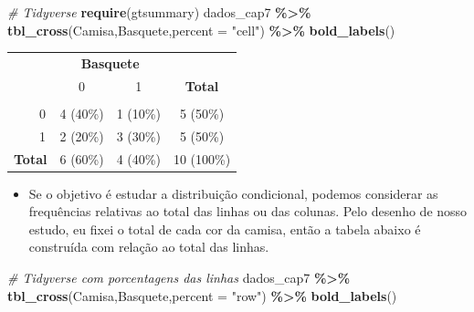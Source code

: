 \documentclass[
]{book}
\newenvironment{Shaded}{\begin{snugshade}}{\end{snugshade}}
\newcommand{\AttributeTok}[1]{\textcolor[rgb]{0.13,0.29,0.53}{#1}}
\newcommand{\CommentTok}[1]{\textcolor[rgb]{0.56,0.35,0.01}{\textit{#1}}}
\newcommand{\FunctionTok}[1]{\textcolor[rgb]{0.13,0.29,0.53}{\textbf{#1}}}
\newcommand{\NormalTok}[1]{#1}
\newcommand{\SpecialCharTok}[1]{\textcolor[rgb]{0.81,0.36,0.00}{\textbf{#1}}}
\newcommand{\StringTok}[1]{\textcolor[rgb]{0.31,0.60,0.02}{#1}}
\providecommand{\tightlist}{%
  \setlength{\itemsep}{0pt}\setlength{\parskip}{0pt}}
\begin{document}
\begin{Shaded}
\begin{Highlighting}[]
\CommentTok{\# Tidyverse}
\FunctionTok{require}\NormalTok{(gtsummary)}
\NormalTok{dados\_cap7 }\SpecialCharTok{\%\textgreater{}\%} \FunctionTok{tbl\_cross}\NormalTok{(Camisa,Basquete,}\AttributeTok{percent =} \StringTok{"cell"}\NormalTok{) }\SpecialCharTok{\%\textgreater{}\%} 
  \FunctionTok{bold\_labels}\NormalTok{()}
\end{Highlighting}
\end{Shaded}

\begin{table}[t]
\fontsize{12.0pt}{14.4pt}\selectfont
\begin{tabular*}{\linewidth}{@{\extracolsep{\fill}}lccc}
\toprule
 & \multicolumn{2}{c}{\textbf{Basquete}} &  \\ 
\cmidrule(lr){2-3}
 & 0 & 1 & \textbf{Total} \\ 
\midrule\addlinespace[2.5pt]
{\bfseries Camisa} &  &  &  \\ 
    0 & 4 (40\%) & 1 (10\%) & 5 (50\%) \\ 
    1 & 2 (20\%) & 3 (30\%) & 5 (50\%) \\ 
{\bfseries Total} & 6 (60\%) & 4 (40\%) & 10 (100\%) \\ 
\bottomrule
\end{tabular*}
\end{table}

\begin{itemize}
\tightlist
\item
  Se o objetivo é estudar a distribuição condicional, podemos considerar as frequências relativas ao total das linhas ou das colunas. Pelo desenho de nosso estudo, eu fixei o total de cada cor da camisa, então a tabela abaixo é construída com relação ao total das linhas.
\end{itemize}

\begin{Shaded}
\begin{Highlighting}[]
\CommentTok{\# Tidyverse com porcentagens das linhas}
\NormalTok{dados\_cap7 }\SpecialCharTok{\%\textgreater{}\%} \FunctionTok{tbl\_cross}\NormalTok{(Camisa,Basquete,}\AttributeTok{percent =} \StringTok{"row"}\NormalTok{) }\SpecialCharTok{\%\textgreater{}\%} 
  \FunctionTok{bold\_labels}\NormalTok{()}
\end{Highlighting}
\end{Shaded}
\end{document}
